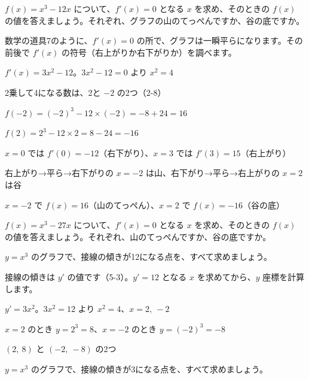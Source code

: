 \begin{reidai}[山のてっぺんと谷の底]
$f(x)=x^3-12x$ について、$f'(x)=0$ となる $x$ を求め、そのときの $f(x)$ の値を答えましょう。それぞれ、グラフの山のてっぺんですか、谷の底ですか。\par
\kangaekata 数学の道具7のように、$f'(x)=0$ の所で、グラフは一瞬平らになります。その前後で $f'(x)$ の符号（右上がりか右下がりか）を調べます。\par
\shiki $f'(x)=3x^2-12$。$3x^2-12=0$ より $x^2=4$\par
\hspace*{2.6\zw}2乗して4になる数は、2と $-2$ の2つ（2-8）\par
\hspace*{2.6\zw}$f(-2)=(-2)^3-12\times(-2)=-8+24=16$\par
\hspace*{2.6\zw}$f(2)=2^3-12\times2=8-24=-16$\par
\hspace*{2.6\zw}$x=0$ では $f'(0)=-12$（右下がり）、$x=3$ では $f'(3)=15$（右上がり）\par
\hspace*{2.6\zw}右上がり→平ら→右下がりの $x=-2$ は山、右下がり→平ら→右上がりの $x=2$ は谷\par
\kotae $x=-2$ で $f(x)=16$（山のてっぺん）、$x=2$ で $f(x)=-16$（谷の底）
\end{reidai}

\begin{jibun}
$f(x)=x^3-27x$ について、$f'(x)=0$ となる $x$ を求め、そのときの $f(x)$ の値を答えましょう。それぞれ、山のてっぺんですか、谷の底ですか。
\end{jibun}

\begin{reidai}[傾きから接点を探す]
$y=x^3$ のグラフで、接線の傾きが12になる点を、すべて求めましょう。\par
\kangaekata 接線の傾きは $y'$ の値です（5-3）。$y'=12$ となる $x$ を求めてから、$y$ 座標を計算します。\par
\shiki $y'=3x^2$。$3x^2=12$ より $x^2=4$、$x=2,\ -2$\par
\hspace*{2.6\zw}$x=2$ のとき $y=2^3=8$、$x=-2$ のとき $y=(-2)^3=-8$\par
\kotae $(2,\ 8)$ と $(-2,\ -8)$ の2つ
\end{reidai}

\begin{jibun}
$y=x^3$ のグラフで、接線の傾きが3になる点を、すべて求めましょう。
\end{jibun}

